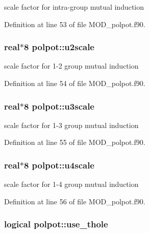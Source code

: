 scale factor for intra-\/group mutual induction 



Definition at line 53 of file M\-O\-D\-\_\-polpot.\-f90.

\hypertarget{classpolpot_a85b778aeb8f3d8700297b7eab1118f47}{
\subsubsection[{u2scale}]{\setlength{\rightskip}{0pt plus 5cm}real$\ast$8 polpot\-::u2scale}}\label{classpolpot_a85b778aeb8f3d8700297b7eab1118f47}


scale factor for 1-\/2 group mutual induction 



Definition at line 54 of file M\-O\-D\-\_\-polpot.\-f90.

\hypertarget{classpolpot_a86ef52add4f615bf1a016c23ffd89cee}{
\subsubsection[{u3scale}]{\setlength{\rightskip}{0pt plus 5cm}real$\ast$8 polpot\-::u3scale}}\label{classpolpot_a86ef52add4f615bf1a016c23ffd89cee}


scale factor for 1-\/3 group mutual induction 



Definition at line 55 of file M\-O\-D\-\_\-polpot.\-f90.

\hypertarget{classpolpot_ac0bfb27f34b9fb631293409ff61214d2}{
\subsubsection[{u4scale}]{\setlength{\rightskip}{0pt plus 5cm}real$\ast$8 polpot\-::u4scale}}\label{classpolpot_ac0bfb27f34b9fb631293409ff61214d2}


scale factor for 1-\/4 group mutual induction 



Definition at line 56 of file M\-O\-D\-\_\-polpot.\-f90.

\hypertarget{classpolpot_aa3cbfbce679dad4d09161d303fd3e4ab}{
\subsubsection[{use\-\_\-thole}]{\setlength{\rightskip}{0pt plus 5cm}logical polpot\-::use\-\_\-thole}}\label{classpolpot_aa3cbfbce679dad4d09161d303fd3e4ab}


